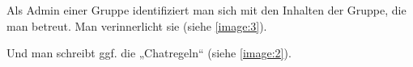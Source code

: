Als Admin einer Gruppe identifiziert man sich mit den Inhalten der
Gruppe, die man betreut. Man verinnerlicht sie (siehe \cref{image:3}).
\begin{figure}
  \caption{}
\end{figure}

\begin{figure}\centering  \vspace{-20pt}
  \par
  \vspace{-10pt}\caption{}\vspace{-10pt}
\end{figure}
Und man schreibt ggf. die „Chatregeln“ (siehe \cref{image:2}).


